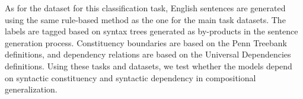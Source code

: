 As for the dataset for this classification task, English sentences are generated using the same rule-based method as the one for the main task datasets.
The labels are tagged based on syntax trees generated as by-products in the sentence generation process.
Constituency boundaries are based on the Penn Treebank~\citep{marcus-etal-1993-building} definitions, and dependency relations are based on the Universal Dependencies~\citep{mcdonald-etal-2013-universal} definitions.
Using these tasks and datasets, we test whether the models depend on syntactic constituency and syntactic dependency in compositional generalization.